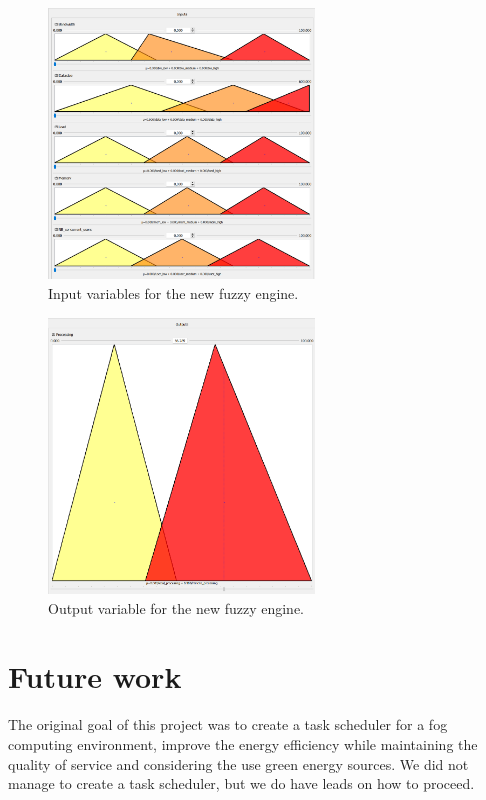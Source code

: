 \begin{figure}[H]
	\centering
	\includegraphics[width=0.63\textwidth]{../images/new-vars-inputs.png}
	\caption{Input variables for the new fuzzy engine.}
	\label{fig:new-fuzzy-engine-inputs}
\end{figure}

\begin{figure}[H]
	\centering
	\includegraphics[width=0.63\textwidth]{../images/new-vars-output.png}
	\caption{Output variable for the new fuzzy engine.}
	\label{fig:new-fuzzy-engine-output}
\end{figure}

\chapter{Future work}
\label{chap:future-work}

The original goal of this project was to create a task scheduler for a fog computing environment, improve the energy
efficiency while maintaining the quality of service and considering the use green energy sources. We did not manage
to create a task scheduler, but we do have leads on how to proceed.

